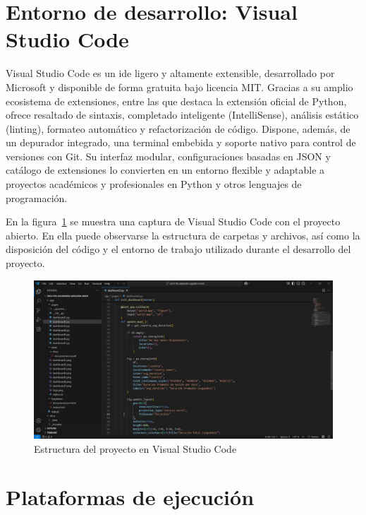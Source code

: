 \documentclass[a4paper, 12pt]{book}
\begin{document}
\section{Entorno de desarrollo: Visual Studio Code}
\label{sec:entorno_de_desarrollo_vscode}

Visual Studio Code es un \gls{ide} ligero y altamente extensible, desarrollado por Microsoft y disponible de forma gratuita bajo licencia MIT. Gracias a su amplio ecosistema de extensiones, entre las que destaca la extensión oficial de Python, ofrece resaltado de sintaxis, completado inteligente (IntelliSense), análisis estático (linting), formateo automático y refactorización de código. Dispone, además, de un depurador integrado, una terminal embebida y soporte nativo para control de versiones con Git. Su interfaz modular, configuraciones basadas en JSON y catálogo de extensiones lo convierten en un entorno flexible y adaptable a proyectos académicos y profesionales en Python y otros lenguajes de programación.

En la figura~\ref{fig:vscode_project} se muestra una captura de Visual Studio Code con el proyecto abierto. En ella puede observarse la estructura de carpetas y archivos, así como la disposición del código y el entorno de trabajo utilizado durante el desarrollo del proyecto.

\begin{figure}[h!]
    \centering
    \includegraphics[width=1.1\textwidth]{img/vstudio.jpeg}
    \caption{Estructura del proyecto en Visual Studio Code}
    \label{fig:vscode_project}
\end{figure}
  

\section{Plataformas de ejecución}
\label{sec:plataformas_de_ejecucion}
\end{document}

